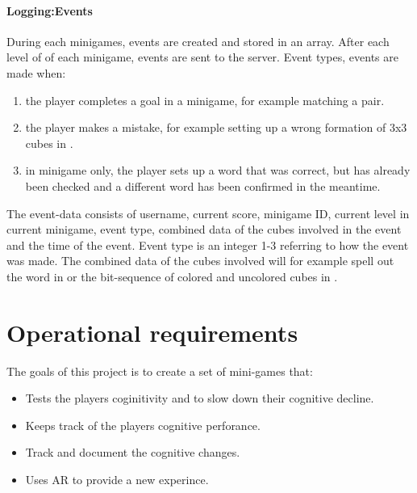 \paragraph{Logging:Events}
During each minigames, events are created and stored in an array. After each level of of each minigame, events are sent to the server.
Event types, events are made when:
\begin{enumerate}
	\item the player completes a goal in a minigame, for example matching a pair.
	\item the player makes a mistake, for example setting up a wrong formation of 3x3 cubes in .
	\item in  minigame only, the player sets up a word that was correct, but has already been checked and a different word has been confirmed in the meantime.
\end{enumerate}
The event-data consists of username, current score, minigame ID, current level in current minigame, event type, combined data of the cubes involved in the event and the time of the event. Event type is an integer 1-3 referring to how the event was made. The combined data of the cubes involved will for example spell out the word in  or the bit-sequence of colored and uncolored cubes in .\\

\section{Operational requirements}
The goals of this project is to create a set of mini-games that:
\begin{itemize}
	\item Tests the players coginitivity and to slow down their cognitive decline.
	\item Keeps track of the players cognitive perforance.
	\item Track and document the cognitive changes.
	\item Uses AR to provide a new experince.
\end{itemize}

